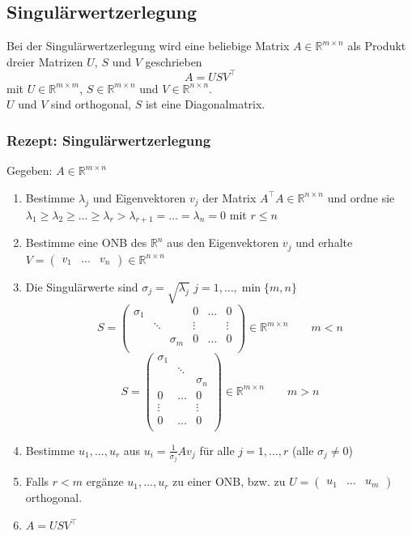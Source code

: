 \documentclass[6pt,a4paper]{scrartcl}
\begin{document}
\begin{multicols*}{4}
\subsection{Singulärwertzerlegung}
Bei der Singulärwertzerlegung wird eine beliebige Matrix $A\in \mathbb{R}^{m\times n}$ als Produkt dreier Matrizen $U$, $S$ und $V$ geschrieben
\begin{equation*}
A=USV^\top
\end{equation*}
mit $U\in \mathbb{R}^{m\times m}$, $S\in \mathbb{R}^{m\times n}$ und $V\in \mathbb{R}^{n\times n}$.\\
$U$ und $V$ sind orthogonal, $S$ ist eine Diagonalmatrix.
\subsubsection{Rezept: Singulärwertzerlegung}
Gegeben: $A\in \mathbb{R}^{m\times n}$
\begin{enumerate}
\item Bestimme $\lambda_j$ und Eigenvektoren $v_j$ der Matrix $A^\top A\in \mathbb{R}^{n\times n}$ und ordne sie \\ $\lambda_1\ge\lambda_2\ge \dots \ge \lambda_r>\lambda_{r+1}=\dots=\lambda_n=0$ mit $r\le n$
\item Bestimme eine ONB des $\mathbb{R}^n$ aus den Eigenvektoren $v_j$ und erhalte $V=\begin{pmatrix} 
v_1 &\dots & v_n
\end{pmatrix} \in \mathbb{R}^{n\times n}$
\item Die Singulärwerte sind $\sigma_j=\sqrt{\lambda_j}$ \qquad $j=1,\dots,\min\{m,n\}$
\begin{equation*}
S=\begin{pmatrix}
\sigma_1 & & & 0 & \dots & 0\\
 & \ddots & &  \vdots &  &  \vdots\\
& & \sigma_m & 0 & \dots & 0\\
\end{pmatrix} \in \mathbb{R}^{m\times n}
\qquad m<n
\end{equation*}
\begin{equation*}
S=\begin{pmatrix}
\sigma_1 & & \\
 & \ddots & \\
& & \sigma_n \\
0 & \dots & 0\\
\vdots &  &  \vdots\\
0 & \dots & 0\\
\end{pmatrix} \in \mathbb{R}^{m\times n}
\qquad m>n
\end{equation*}
\item Bestimme $u_1,\dots,u_r$ aus $u_i=\frac{1}{\sigma_j}Av_j$ für alle $j=1,\dots,r$ (alle $\sigma_j\ne 0$)
\item Falls $r<m$ ergänze $u_1,\dots,u_r$ zu einer ONB, bzw. zu $U=\begin{pmatrix}
u_1 & \dots & u_m
\end{pmatrix}$
orthogonal.
\item $A=USV^\top$
\end{enumerate}


\end{multicols*}
\end{document}
